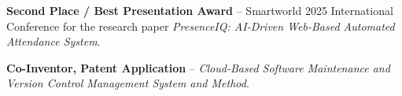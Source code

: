 \begin{cvlist}
    \item \textbf{Second Place / Best Presentation Award} -- Smartworld 2025 International Conference for the research paper \textit{PresenceIQ: AI-Driven Web-Based Automated Attendance System}.
    \item \textbf{Co-Inventor, Patent Application} -- \textit{Cloud-Based Software Maintenance and Version Control Management System and Method}.
\end{cvlist}
